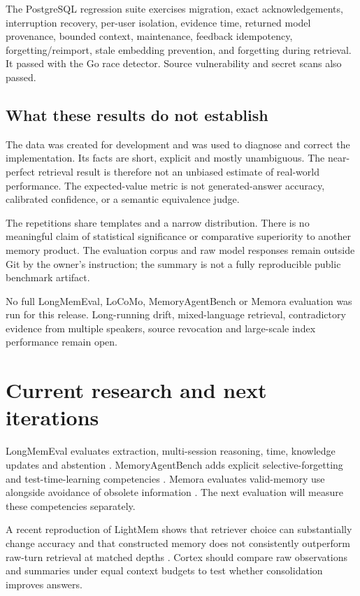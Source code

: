 \documentclass[11pt]{article}
\begin{document}
The PostgreSQL regression suite exercises migration, exact acknowledgements, interruption recovery, per-user isolation, evidence time, returned model provenance, bounded context, maintenance, feedback idempotency, forgetting/reimport, stale embedding prevention, and forgetting during retrieval. It passed with the Go race detector. Source vulnerability and secret scans also passed.

\subsection{What these results do not establish}
The data was created for development and was used to diagnose and correct the implementation. Its facts are short, explicit and mostly unambiguous. The near-perfect retrieval result is therefore not an unbiased estimate of real-world performance. The expected-value metric is not generated-answer accuracy, calibrated confidence, or a semantic equivalence judge.

The repetitions share templates and a narrow distribution. There is no meaningful claim of statistical significance or comparative superiority to another memory product. The evaluation corpus and raw model responses remain outside Git by the owner's instruction; the summary is not a fully reproducible public benchmark artifact.

No full LongMemEval, LoCoMo, MemoryAgentBench or Memora evaluation was run for this release. Long-running drift, mixed-language retrieval, contradictory evidence from multiple speakers, source revocation and large-scale index performance remain open.

\section{Current research and next iterations}
LongMemEval evaluates extraction, multi-session reasoning, time, knowledge updates and abstention \cite{longmem}. MemoryAgentBench adds explicit selective-forgetting and test-time-learning competencies \cite{mab}. Memora evaluates valid-memory use alongside avoidance of obsolete information \cite{memora}. The next evaluation will measure these competencies separately.

A recent reproduction of LightMem shows that retriever choice can substantially change accuracy and that constructed memory does not consistently outperform raw-turn retrieval at matched depths \cite{lightrepro}. Cortex should compare raw observations and summaries under equal context budgets to test whether consolidation improves answers.
\end{document}
